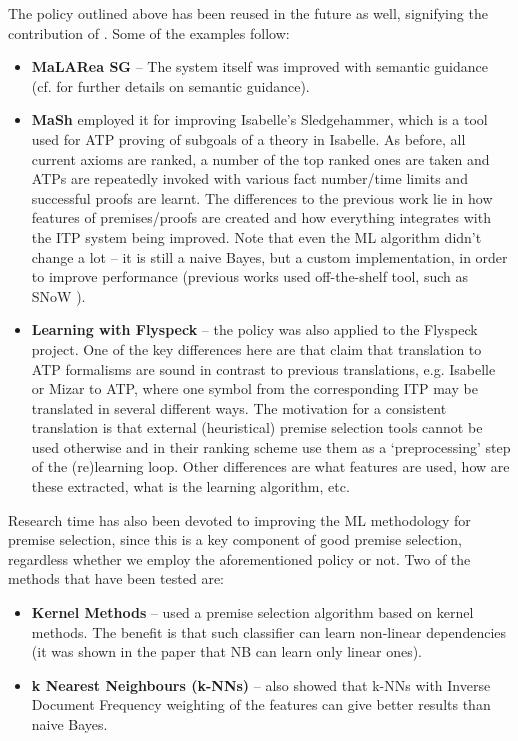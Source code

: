 \documentclass{article}
\begin{document}
The policy outlined above has been reused in the future as well, signifying the
contribution of \cite{MaLARea}. Some of the examples follow:
\begin{itemize}
    \item \textbf{MaLARea SG} \cite{MaLAReaSG} -- The system itself was
        improved with semantic guidance (cf. \cite{SRASS} for further details
        on semantic guidance).
    \item \textbf{MaSh} \cite{MaSh} employed it for improving Isabelle's
        Sledgehammer, which is a tool used for ATP proving of subgoals of
        a theory in Isabelle.  As before, all current axioms are ranked,
        a number of the top ranked ones are taken and ATPs are repeatedly
        invoked with various fact number/time limits and successful proofs are
        learnt. The differences to the previous work lie in how features of
        premises/proofs are created and how everything integrates with the
        ITP system being improved. Note that even the ML algorithm didn't
        change a lot -- it is still a naive Bayes, but a custom
        implementation, in order to improve performance (previous works used
        off-the-shelf tool, such as SNoW \citep{SNoW}).
    \item \textbf{Learning with Flyspeck } -- the policy was also applied to
        the Flyspeck project\citep{FlyspeckProject}. One of the key differences
        here are that \cite{Flyspeck} claim that translation to ATP formalisms
        are sound in contrast to previous translations, e.g. Isabelle or Mizar
        to ATP, where one symbol from the corresponding ITP may be translated
        in several different ways. The motivation for a consistent translation
        is that external (heuristical) premise selection tools cannot be used
        otherwise and in their ranking scheme \cite{Flyspeck} use them as
        a `preprocessing' step of the (re)learning loop. Other differences are
        what features are used, how are these extracted, what is the learning
        algorithm, etc.
\end{itemize}

Research time has also been devoted to improving the ML methodology for
premise selection, since this is a key component of good premise selection,
regardless whether we employ the aforementioned policy or not. Two of the
methods that have been tested are:
\begin{itemize}
    \item \textbf{Kernel Methods} -- 
        \cite{PremiseSelection} used a premise selection algorithm based on
        kernel methods. The benefit is that such classifier can learn
        non-linear dependencies (it was shown in the paper that NB can learn
        only linear ones). 
    \item \textbf{k Nearest Neighbours (k-NNs)} -- \cite{FlyspeckFeatW} also
        showed that k-NNs with Inverse Document Frequency weighting of the
        features can give better results than naive Bayes. 
\end{itemize}
\end{document}
